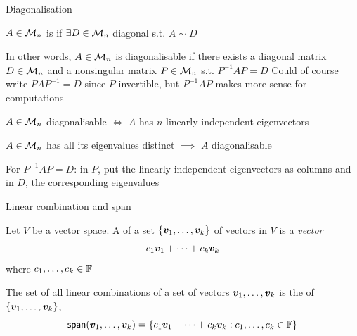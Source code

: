 \documentclass[aspectratio=169]{beamer}\usepackage[]{graphicx}\usepackage[]{xcolor}
\begin{document}
\begin{frame}{Diagonalisation}
\begin{importantdefinition}[Diagonalisability]
$A\in\mathcal{M}_n$ is  if $\exists D\in\mathcal{M}_n$ diagonal s.t. $A\sim D$
\end{importantdefinition}
\vfill
In other words, $A\in\mathcal{M}_n$ is diagonalisable if there exists a diagonal matrix $D\in\mathcal{M}_n$ and a nonsingular matrix $P\in\mathcal{M}_n$ s.t. $P^{-1}AP=D$
\vfill
Could of course write $PAP^{-1}=D$ since $P$ invertible, but $P^{-1}AP$ makes more sense for computations
\end{frame}


\begin{frame}
\begin{importanttheorem}
$A\in\mathcal{M}_n$ diagonalisable $\iff$ $A$ has $n$ linearly independent eigenvectors
\end{importanttheorem}
\vfill
\begin{corollary}
$A\in\mathcal{M}_n$ has all its eigenvalues distinct $\implies$ $A$ diagonalisable
\end{corollary}
\vfill
For $P^{-1}AP=D$: in $P$, put the linearly independent eigenvectors as columns and in $D$, the corresponding eigenvalues
\end{frame}



\begin{frame}{Linear combination and span}
	\begin{importantdefinition}
		Let $V$ be a vector space.
		A  of a set $\{\bm{v}_1,\ldots,\bm{v}_k\}$ of vectors in $V$ is a \emph{vector}
		\[
		c_1\bm{v}_1+\cdots+c_k\bm{v}_k
		\]
		where $c_1,\ldots,c_k\in\mathbb{F}$
	\end{importantdefinition}
	\vfill
	\begin{importantdefinition}[Span]
		The set of all linear combinations of a set of vectors $\bm{v}_1,\ldots,\bm{v}_k$ is the  of $\{\bm{v}_1,\ldots,\bm{v}_k\}$,
		\[
		\mathsf{span}(\bm{v}_1,\ldots,\bm{v}_k)=
		\left\{
		c_1\bm{v}_1+\cdots+c_k\bm{v}_k:c_1,\ldots,c_k\in\mathbb{F}
		\right\}
		\]
	\end{importantdefinition}
\end{frame}
\end{document}
